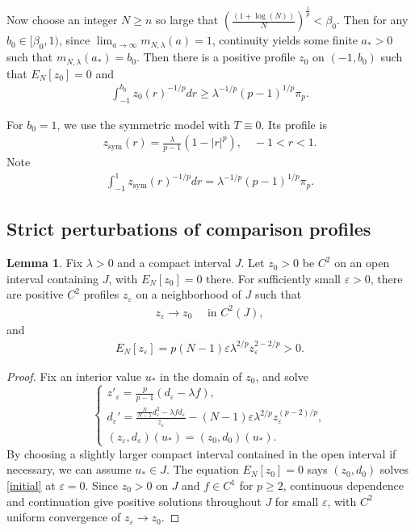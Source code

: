 \documentclass[11pt]{amsart}
\def \eps {\varepsilon}
\theoremstyle{definition}
\newtheorem{lemma}[theorem]{Lemma}
\begin{document}
Now choose an integer $N\geq n$ so large that $ \left(\frac{(1+\log(N))}{N}\right)^{\frac{1}{p}}<\beta_0$.  Then for any $b_0\in [\beta_0,1)$, since $\displaystyle \lim_{a\to \infty} m_{N,\lambda}(a)=1$, continuity yields some finite $a_*>0$ such that $m_{N,\lambda}(a_*)=b_0$.  Then there is a positive profile $z_0$ on $(-1,b_0)$ such that $E_N[z_0]=0$ and
\begin{align*}
    \int_{-1}^{b_0}z_0(r)^{-1/p}dr\geq \lambda^{-1/p}(p-1)^{1/p}\pi_p.
\end{align*}

For $b_0=1$, we use the symmetric model with $T\equiv 0$. Its profile is
\begin{align*}
    z_{\text{sym}}(r)=\frac{\lambda}{p-1}(1-|r|^p), \quad -1<r<1.
\end{align*}Note
\begin{align*}
    \int_{-1}^1z_{\text{sym}}(r)^{-1/p}dr=\lambda^{-1/p}(p-1)^{1/p}\pi_p.
\end{align*}

\subsection{Strict perturbations of comparison profiles}
\begin{lemma}\label{converge}
    Fix $\lambda>0$ and a compact interval $J$.  Let $z_0>0$ be $C^2$ on an open interval containing $J$, with $E_N[z_0]=0$ there.  For sufficiently small $\eps>0$, there are positive $C^2$ profiles $z_\eps$ on a neighborhood of $J$ such that 
    \begin{align*}
        z_\eps \to z_0 \quad \text{ in }C^2(J),
    \end{align*}
    and
    \begin{align*}
        E_N[z_\eps]=p(N-1)\eps\lambda^{2/p}z_\eps^{2-2/p}>0.
    \end{align*}
\end{lemma}
\begin{proof}
    Fix an interior value $u_*$ in the domain of $z_0$, and solve
    \begin{equation}
        \begin{cases}\label{initial}
            z'_\eps=\frac{p}{p-1}(d_\eps-\lambda f),\\
            d_\eps'=\frac{\frac{N}{N-1}d^2_\eps-\lambda f d_\eps}{z_\eps}-(N-1)\eps\lambda^{2/p}z_\eps^{(p-2)/p},\\
            (z_\eps,d_\eps)(u_*)=(z_0,d_0)(u_*).
        \end{cases}
    \end{equation}
   By choosing a slightly larger compact interval contained in the open interval if necessary, we can assume $u_*\in J$.  The equation $E_N[z_0]=0$ says $(z_0,d_0)$ solves \eqref{initial} at $\eps=0$. Since $z_0>0$ on $J$ and $f \in C^1$ for $p\geq 2$, continuous dependence and continuation give positive solutions throughout $J$ for small $\eps$, with $C^2$ uniform convergence of $z_\eps\to z_0$.  
\end{proof}
\end{document}
